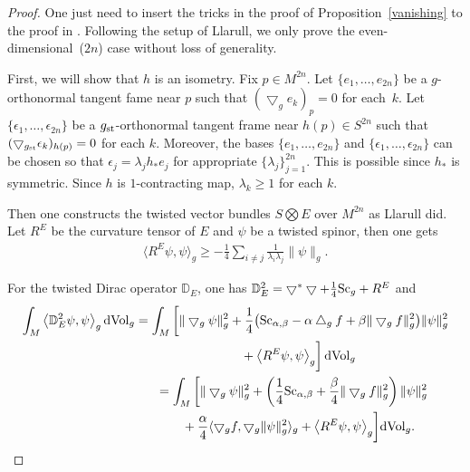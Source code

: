 \documentclass[pdftex]{sigma}
\begin{document}
\begin{proof}One just need to insert the tricks in the proof of Proposition~\ref{vanishing} to the proof in \cite[Theorem~4.1]{MR1600027}. Following the setup of Llarull, we only prove the even-dimensional~($2n$) case without loss of generality.

First, we will show that $h$ is an isometry. Fix $p\in M^{2n}$. Let $\{e_1,\dots, e_{2n}\}$ be a $g$-orthonormal tangent fame near $p$ such that $(\bigtriangledown_g e_k)_p=0$ for each~$k$. Let $\{\epsilon_1,\dots,\epsilon_{2n}\}$ be a $g_{\rm st}$-orthonormal tangent frame near $h(p)\in S^{2n}$ such that $(\bigtriangledown_{g_{\rm st}}\epsilon_k)_{h(p)}=0$ for each $k$. Moreover, the bases $\{e_1,\dots, e_{2n}\}$ and $\{\epsilon_1,\dots,\epsilon_{2n}\}$ can be chosen so that $\epsilon_j=\lambda_jh_*e_j$ for appropriate $\{\lambda_j\}_{j=1}^{2n}$. This is possible since $h_*$ is symmetric. Since $h$ is $1$-contracting map, $\lambda_k\geq 1$ for each $k$.

 Then one constructs the twisted vector bundles $S \bigotimes E$ over $M^{2n}$ as Llarull did. Let $R^E$ be the curvature tensor of $E$ and $\psi$ be a twisted spinor, then one gets
 \begin{gather*}
 \big\langle R^E\psi, \psi\big\rangle_g \geq -\frac{1}{4}\sum_{i\neq j}\frac{1}{\lambda_i\lambda_j}\|\psi\|_g.
\end{gather*}

For the twisted Dirac operator $\mathbb{D}_E$, one has $\mathbb{D}^2_E=\bigtriangledown^*\bigtriangledown + \frac{1}{4}{\rm Sc}_g + R^E$ and
\begin{gather*}
\int_M \big\langle \mathbb{D}^2_E \psi, \psi \big\rangle_g \,{\rm dVol}_g = \int_M \bigg[\|\bigtriangledown_g\psi\|^2_g + \frac{1}{4}\big({\rm Sc}_{\alpha, \beta} - \alpha \bigtriangleup_g f + \beta\|\bigtriangledown_gf\|^2_g\big)\|\psi\|^2_g \\
\hphantom{\int_M \big\langle \mathbb{D}^2_E \psi, \psi \big\rangle_g \,{\rm dVol}_g =}{} + \big\langle R^E\psi, \psi\big\rangle_g\bigg] \,{\rm dVol}_g\\
\hphantom{\int_M \big\langle \mathbb{D}^2_E \psi, \psi \big\rangle_g \,{\rm dVol}_g}{}
 = \int_M \bigg[\|\bigtriangledown_g\psi\|^2_g + \left(\frac{1}{4}{\rm Sc}_{\alpha, \beta} + \frac{\beta}{4}\|\bigtriangledown_g f\|^2_g\right)\|\psi\|^2_g \\
\hphantom{\int_M \big\langle \mathbb{D}^2_E \psi, \psi \big\rangle_g \,{\rm dVol}_g =}{}
 + \frac{\alpha}{4} \langle \bigtriangledown_gf, \bigtriangledown_g\|\psi\|^2_g\rangle_g + \big\langle R^E\psi, \psi\big\rangle_g\bigg] {\rm dVol}_g .
\end{gather*}


\end{proof}
\end{document}
